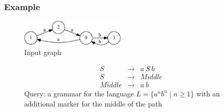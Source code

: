 \documentclass{beamer}
\begin{document}
\begin{frame}
  \transwipe[direction=90]
  \frametitle{Example}
\begin{figure}[ht]
    \centering
        \includegraphics[width=0.45\textwidth]{pictures/input.pdf}\\
        Input graph
\end{figure}
\begin{figure}[ht]
\centering
   \[
\begin{array}{rrl} 
   S & \rightarrow & a \ S \ b \\
   S & \rightarrow & Middle \\
   Middle & \rightarrow & a \ b
\end{array}
\]
   Query: a grammar for the language $L=\{a^n b^n \mid n \geq 1\}$ with an additional marker for the middle of the path
   \label{grammarG}        
    \end{figure}
\end{frame}
\end{document}
